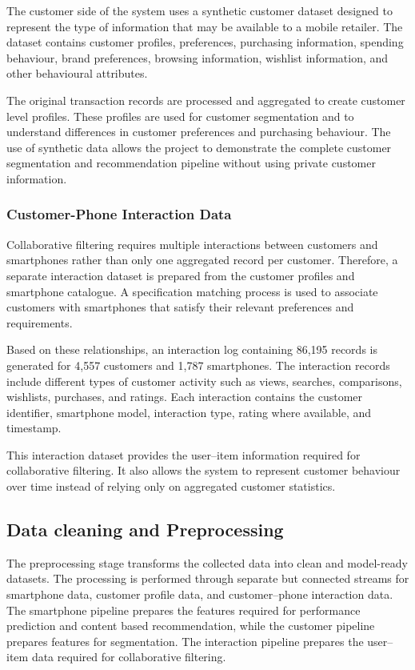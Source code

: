 \documentclass[12pt]{report}
\numberwithin{figure}{chapter}
\numberwithin{table}{chapter}
\numberwithin{equation}{chapter}
\begin{document}
The customer side of the system uses a synthetic customer dataset designed to represent the type of information that may be available to a mobile retailer. The dataset contains customer profiles, preferences, purchasing information, spending behaviour, brand preferences, browsing information, wishlist information, and other behavioural attributes.

The original transaction records are processed and aggregated to create customer level profiles. These profiles are used for customer segmentation and to understand differences in customer preferences and purchasing behaviour. The use of synthetic data allows the project to demonstrate the complete customer segmentation and recommendation pipeline without using private customer information.


\subsubsection{Customer-Phone Interaction Data}

Collaborative filtering requires multiple interactions between customers and smartphones rather than only one aggregated record per customer. Therefore, a separate interaction dataset is prepared from the customer profiles and smartphone catalogue. A specification matching process is used to associate customers with smartphones that satisfy their relevant preferences and requirements.

Based on these relationships, an interaction log containing 86,195 records is generated for 4,557 customers and 1,787 smartphones. The interaction records include different types of customer activity such as views, searches, comparisons, wishlists, purchases, and ratings. Each interaction contains the customer identifier, smartphone model, interaction type, rating where available, and timestamp.

This interaction dataset provides the user--item information required for collaborative filtering. It also allows the system to represent customer behaviour over time instead of relying only on aggregated customer statistics.


\subsection{Data cleaning and  Preprocessing}

The preprocessing stage transforms the collected data into clean and model-ready datasets. The processing is performed through separate but connected streams for smartphone data, customer profile data, and customer--phone interaction data. The smartphone pipeline prepares the features required for performance prediction and content based recommendation, while the customer pipeline prepares features for segmentation. The interaction pipeline prepares the user--item data required for collaborative filtering.
\end{document}
